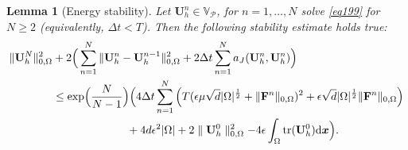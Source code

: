 \documentclass[final,12pt]{amsart}
\theoremstyle{plain}
\newtheorem{lemma}[theorem]{Lemma}
\theoremstyle{definition}
\newcommand\bx{\boldsymbol{x}}
\newcommand\calP{{\mathcal{P}}}
\newcommand\bU{\mathbf{U}}
\begin{document}
\begin{lemma}[Energy stability]
	Let $\bU^{n}_{h}\in  \mathbb{V}_\calP$, for $n=1,\ldots, N$ solve \eqref{eq199} for $N\ge 2$ (equivalently, $\Delta t<T$). Then the following stability estimate holds true:
	\begin{equation}
	\begin{aligned}\label{Stabilityestimate}
		\| \mathbf{U}_{h}^{N} \|_{0,\Omega}^{2}
		&+ 2\Big(\sum_{n=1}^{N}\| \mathbf{U}_{h}^{n} - \mathbf{U}_{h}^{n-1} \|_{0,\Omega}^{2}
		+  2 \Delta t \sum_{n=1}^{N}a_{J}(\mathbf{U}_{h}^{n}, \mathbf{U}_{h}^{n}) \Big)
		\\
		&\leq
		\exp\!\Big(\frac{N}{N-1}\Big)\Big(
		4\Delta t\sum_{n=1}^{N}\Big(
		T(\epsilon\mu \sqrt{d}\lvert \Omega \rvert^{\frac{1}{2}}+\|\mathbf{F}^{n}\|_{0,\Omega})^{2}
		+\epsilon \sqrt{d} \lvert \Omega \rvert^{\frac{1}{2}}\|\mathbf{F}^{n}\|_{0,\Omega}\Big)
		\\
		&\hspace{2.35cm}
		+4d \epsilon^{2}\lvert \Omega \rvert
		+2\parallel  \mathbf{U}_{h}^{0}\parallel_{0,\Omega}^{2}
		-4\epsilon\int_\Omega{\rm tr}(\mathbf{U}_{h}^{0}){\rm d}\bx\Big).
	\end{aligned}
	\end{equation}
\end{lemma}
\end{document}
